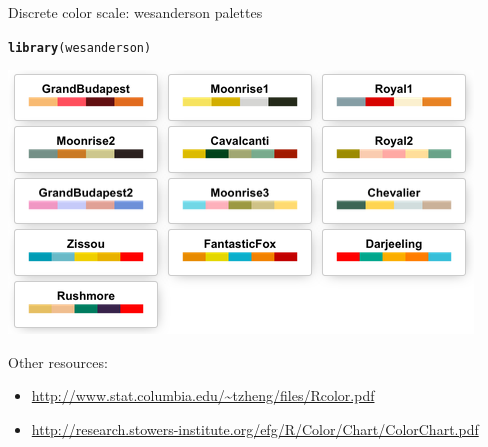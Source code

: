 \documentclass{beamer}\usepackage[]{graphicx}\usepackage[]{color}
\makeatletter
\newcommand{\hlstd}[1]{\textcolor[rgb]{0.345,0.345,0.345}{#1}}%
\newcommand{\hlkwd}[1]{\textcolor[rgb]{0.737,0.353,0.396}{\textbf{#1}}}%
\newenvironment{kframe}{%
 \def\at@end@of@kframe{}%
 \ifinner\ifhmode%
  \def\at@end@of@kframe{\end{minipage}}%
  \begin{minipage}{\columnwidth}%
 \fi\fi%
 \def\FrameCommand##1{\hskip\@totalleftmargin \hskip-\fboxsep
 \colorbox{shadecolor}{##1}\hskip-\fboxsep
     \hskip-\linewidth \hskip-\@totalleftmargin \hskip\columnwidth}%
 \MakeFramed {\advance\hsize-\width
   \@totalleftmargin\z@ \linewidth\hsize
   \@setminipage}}%
 {\par\unskip\endMakeFramed%
 \at@end@of@kframe}
\newenvironment{knitrout}{}{} %
\makeatother
\begin{document}
\begin{frame}[fragile]{Discrete color scale: wesanderson palettes}
\begin{knitrout}\footnotesize
{}\color{fgcolor}\begin{kframe}
\begin{alltt}
\hlkwd{library}\hlstd{(wesanderson)}
\end{alltt}
\end{kframe}
\end{knitrout}
\begin{center}
\includegraphics[scale=0.5]{wesanderson-color.png}
\end{center}

Other resources: 
\begin{itemize}
\item \url{http://www.stat.columbia.edu/~tzheng/files/Rcolor.pdf}
\item \url{http://research.stowers-institute.org/efg/R/Color/Chart/ColorChart.pdf}
\end{itemize}
\end{frame}
\end{document}
